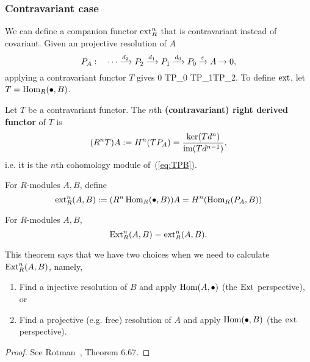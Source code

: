 \subsubsection{Contravariant case}
We can define a companion functor $\operatorname{ext}_R^n$ that is contravariant instead of covariant. Given an projective resolution of $A$
\[
P_A:\quad \cdots \xrightarrow{d_2} P_2\xrightarrow{d_1}P_1\xrightarrow{d_0}P_0 \xrightarrow{\varepsilon} A\to 0,
\]
applying a contravariant functor $T$ gives
0 %
TP_0  TP_1TP_2\cdots. 
\eeq
To define $\operatorname{ext}$, let $T=\operatorname{Hom}_R(\bullet, B)$.
\begin{df}
Let $T$ be a contravariant functor.
The $n$th \textbf{(contravariant) right derived functor} of $T$ is
\[
(R^nT)A:=H^n(TP_A)=\frac{\ker(Td^n)}{\text{im}(Td^{n-1})},
\]
i.e. it is the $n$th cohomology module of~(\ref{eq:TPB}).

For $R$-modules $A,B$, define
\[
\operatorname{ext}_R^n(A, B):=(R^n\operatorname{Hom}_R(\bullet,B))A=H^n(\operatorname{Hom}_R(P_A,B))
\]
\end{df}
\begin{thm}
For $R$-modules $A,B$,
\[
\operatorname{Ext}_R^n(A,B)=\operatorname{ext}_R^n(A,B).
\]
\end{thm}
This theorem says that we have two choices when we need to calculate $\operatorname{Ext}_R^n(A,B)$, namely,
\begin{enumerate}
\item Find a injective resolution of $B$ and apply $\operatorname{Hom}(A,\bullet)$ (the $\operatorname{Ext}$ perspective), or
\item Find a projective (e.g. free) resolution of $A$ and apply $\operatorname{Hom}(\bullet, B)$ (the $\operatorname{ext}$ perspective).
\end{enumerate}


\begin{proof}
See Rotman~\cite{Ro09}, Theorem 6.67.
\end{proof}
